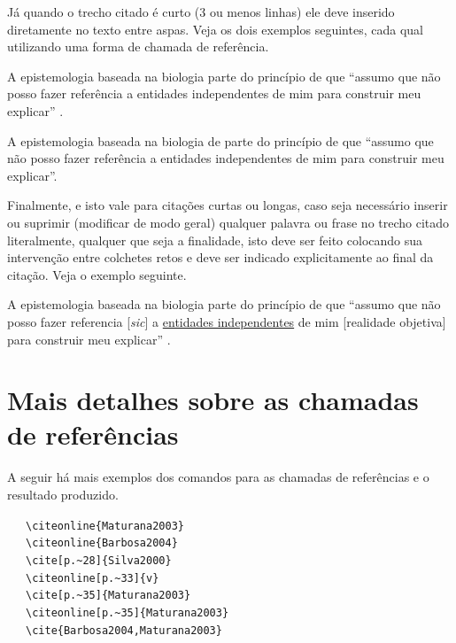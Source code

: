 \begin{apendicesenv}
Já quando o trecho citado é curto (3 ou menos linhas) ele deve inserido diretamente no texto entre aspas. Veja os dois exemplos seguintes, cada qual utilizando uma forma de chamada de referência.

A epistemologia baseada na biologia parte do princípio de que ``assumo que não posso fazer referência a entidades independentes de mim para construir meu explicar'' \cite[p.~35]{Maturana2003}.

A epistemologia baseada na biologia de  parte do princípio de que ``assumo que não posso fazer referência a entidades independentes de mim para construir meu explicar''.

Finalmente, e isto vale para citações curtas ou longas, caso seja necessário inserir ou suprimir (modificar de modo geral) qualquer palavra ou frase no trecho citado literalmente, qualquer que seja a finalidade, isto deve ser feito colocando sua intervenção entre colchetes retos e deve ser indicado explicitamente ao final da citação. Veja o exemplo seguinte.

A epistemologia baseada na biologia parte do princípio de que ``assumo que não posso fazer referencia [\textit{sic}] a \underline{entidades independentes} de mim [realidade objetiva] para construir meu explicar'' \cite[p.~35, comentários e grifo nosso]{Maturana2003}.

\section{Mais detalhes sobre as chamadas de referências}
\label{sec:referUtilizadas}

A seguir há mais exemplos dos comandos para as chamadas de referências e o resultado produzido.

 \ \ \  \verb|\citeonline{Maturana2003}|\\
 \ \ \   \verb|\citeonline{Barbosa2004}|\\
\cite[p.~28]{Silva2000} \ \ \  \verb|\cite[p.~28]{Silva2000}|\\
 \ \ \   \verb|\citeonline[p.~33]{v}|\\
\cite[p.~35]{Maturana2003} \ \ \   \verb|\cite[p.~35]{Maturana2003}|\\
 \ \ \   \verb|\citeonline[p.~35]{Maturana2003}|\\
\cite{Barbosa2004,Maturana2003} \ \ \   \verb|\cite{Barbosa2004,Maturana2003}|\\


\end{apendicesenv}
